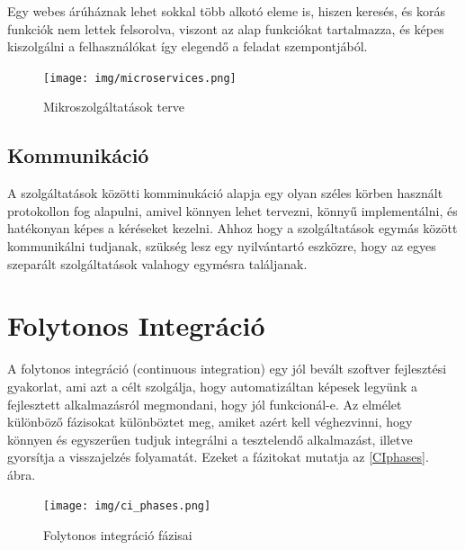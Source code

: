 \documentclass[11pt,magyar,a4paper,twoside,]{report}
\begin{document}
Egy webes árúháznak lehet sokkal több alkotó eleme is, hiszen keresés,
és korás funkciók nem lettek felsorolva, viszont az alap funkciókat
tartalmazza, és képes kiszolgálni a felhasználókat így elegendő a
feladat szempontjából.

\begin{figure}[H]
\centering
\texttt{[image: img/microservices.png]}
\caption{Mikroszolgáltatások terve}
\end{figure}

\subsection{Kommunikáció}\label{kommunikuxe1ciuxf3}

A szolgáltatások közötti komminukáció alapja egy olyan széles körben
használt protokollon fog alapulni, amivel könnyen lehet tervezni, könnyű
implementálni, és hatékonyan képes a kéréseket kezelni. Ahhoz hogy a
szolgáltatások egymás között kommunikálni tudjanak, szükség lesz egy
nyilvántartó eszközre, hogy az egyes szeparált szolgáltatások valahogy
egymésra találjanak.

\section{Folytonos Integráció}\label{folytonos-integruxe1ciuxf3}

A folytonos integráció\citep{continuous-integration} (continuous
integration) egy jól bevált szoftver fejlesztési gyakorlat, ami azt a
célt szolgálja, hogy automatizáltan képesek legyünk a fejlesztett
alkalmazásról megmondani, hogy jól funkcionál-e. Az elmélet különböző
fázisokat különböztet meg, amiket azért kell véghezvinni, hogy könnyen
és egyszerűen tudjuk integrálni a tesztelendő alkalmazást, illetve
gyorsítja a visszajelzés folyamatát. Ezeket a fázitokat mutatja az
\ref{CIphases}. ábra.

\begin{figure}[H]
\centering
\texttt{[image: img/ci\_phases.png]}
\caption{Folytonos integráció fázisai}
\end{figure}
\end{document}
